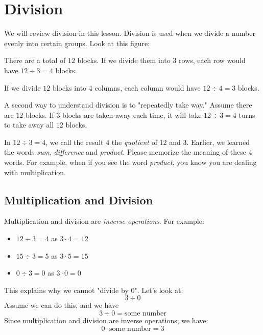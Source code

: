 
\section{Division}

We will review division in this lesson. Division is used when we divide a number evenly into certain groups. Look at this figure:
\\[0.1in]
\begin{tightcenter}
   \label{fig:grid}
\end{tightcenter}

There are a total of $12$ blocks. If we divide them into $3$ rows, each row would have $12 \div 3 = 4$ blocks.

If we divide $12$ blocks into $4$ columns, each column would have $12 \div 4 = 3$ blocks.

A second way to understand division is to "repeatedly take way." Assume there are $12$ blocks. If $3$ blocks are taken away each time, it will take $12 \div 3 = 4$ turns to take away all $12$ blocks.

In $12 \div 3 = 4$, we call the result $4$ the \textit{quotient} of $12$ and $3$. Earlier, we learned the words \textit{sum}, \textit{difference} and \textit{product}. Please memorize the meaning of these $4$ words. For example, when if you see the word \textit{product}, you know you are dealing with multiplication.

\subsection{Multiplication and Division}

Multiplication and division are \textit{inverse operations}. For example:
\begin{itemize}
\item $12 \div 3 = 4$ as $3 \cdot 4 = 12$
\item $15 \div 3 = 5$ as $3 \cdot 5 = 15$
\item $0 \div 3 = 0$ as $3 \cdot 0 = 0$
\end{itemize}

This explains why we cannot "divide by $0$". Let's look at:
\[ 3 \div 0 \]
Assume we can do this, and we have 
\[ 3 \div 0 = \text{some number} \] 
Since multiplication and division are inverse operations, we have:
\[ 0 \cdot \text{some number} = 3 \]

